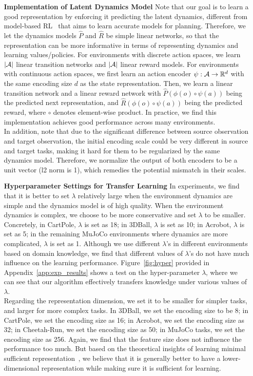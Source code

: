 \textbf{Implementation of Latent Dynamics Model}\quad
Note that our goal is to learn a good representation by enforcing it predicting the latent dynamics, different from model-based RL~\citep{hafner2019dream} that aims to learn accurate models for planning. Therefore, we let the dynamics models $\hat{P}$ and $\hat{R}$ be simple linear networks, so that the representation can be more informative in terms of representing dynamics and learning values/policies. For environments with discrete action spaces, we learn $|\mathcal{A}|$ linear transition networks and $|\mathcal{A}|$ linear reward models. For environments with continuous action spaces, we first learn an action encoder $\psi: \mathcal{A} \to \mathbb{R}^d$ with the same encoding size $d$ as the state representation. Then, we learn a linear transition network and a linear reward network with $\hat{P}(\phi(o)\circ\psi(a))$ being the predicted next representation, and $\hat{R}(\phi(o)\circ\psi(a))$ being the predicted reward, where $\circ$ denotes element-wise product. In practice, we find this implementation achieves good performance across many environments. \\
In addition, note that due to the significant difference between source observation and target observation, the initial encoding scale could be very different in source and target tasks, making it hard for them to be regularized by the same dynamics model. Therefore, we normalize the output of both encoders to be a unit vector (l2 norm is 1), which remedies the potential mismatch in their scales.

\textbf{Hyperparameter Settings for Transfer Learning}\quad
In experiments, we find that it is better to set $\lambda$ relatively large when the environment dynamics are simple and the dynamics model is of high quality. When the environment dynamics is complex, we choose to be more conservative and set $\lambda$ to be smaller. Concretely, in CartPole, $\lambda$ is set as 18; in 3DBall, $\lambda$ is set as 10; in Acrobot, $\lambda$ is set as 5; in the remaining MuJoCo environments where dynamics are more complicated, $\lambda$ is set as 1. Although we use different $\lambda$'s in different environments based on domain knowledge, we find that different values of $\lambda$'s do not have much influence on the learning performance. Figure~\ref{fig:hyper} provided in Appendix~\ref{app:exp_results} shows a test on the hyper-parameter $\lambda$, where we can see that our algorithm effectively transfers knowledge under various values of $\lambda$. \\
Regarding the representation dimension, we set it to be smaller for simpler tasks, and larger for more complex tasks. In 3DBall, we set the encoding size to be 8; in CartPole, we set the encoding size as 16; in Acrobot, we set the encoding size as 32; in Cheetah-Run, we set the encoding size as 50; in MuJoCo tasks, we set the encoding size as 256. Again, we find that the feature size does not influence the performance too much. But based on the theoretical insights of learning minimal sufficient representation~\cite{achille2018emergence}, we believe that it is generally better to have a lower-dimensional representation while making sure it is sufficient for learning.

